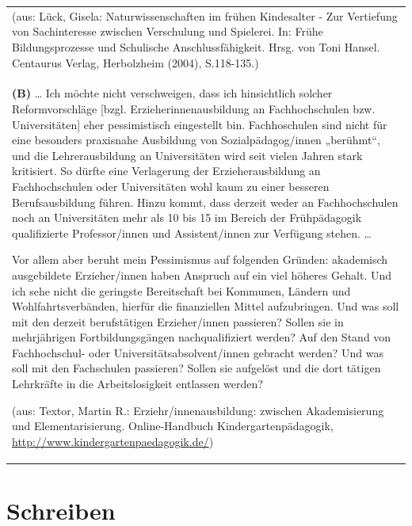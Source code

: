 \documentclass[]{book}
\theoremstyle{definition}
\theoremstyle{definition}
\theoremstyle{definition}
\theoremstyle{remark}
\begin{document}
\begin{longtable}[]{@{}l@{}}
\begin{minipage}[t]{0.97\columnwidth}
(aus: Lück, Gisela: Naturwissenschaften im frühen Kindesalter - Zur
Vertiefung von Sachinteresse zwischen Verschulung und Spielerei. In:
Frühe Bildungsprozesse und Schulische Anschlussfähigkeit. Hrsg. von Toni
Hansel. Centaurus Verlag, Herbolzheim (2004), S.118-135.)
\vspace{-6mm}\strut
\end{minipage}\tabularnewline
\begin{minipage}[t]{0.97\columnwidth}\raggedright\strut
\textbf{(B)} \ldots{} Ich möchte nicht verschweigen, dass ich
hinsichtlich solcher Reformvorschläge {[}bzgl. Erzieherinnenausbildung
an Fachhochschulen bzw. Universitäten{]} eher pessimistisch eingestellt
bin. Fachhoschulen sind nicht für eine besonders praxisnahe Ausbildung
von Sozialpädagog/innen „berühmt``, und die Lehrerausbildung an
Universitäten wird seit vielen Jahren stark kritisiert. So dürfte eine
Verlagerung der Erzieherausbildung an Fachhochschulen oder Universitäten
wohl kaum zu einer besseren Berufsausbildung führen. Hinzu kommt, dass
derzeit weder an Fachhochschulen noch an Universitäten mehr als 10 bis
15 im Bereich der Frühpädagogik qualifizierte Professor/innen und
Assistent/innen zur Verfügung stehen. \ldots{}

Vor allem aber beruht mein Pessimismus auf folgenden Gründen: akademisch
ausgebildete Erzieher/innen haben Anspruch auf ein viel höheres Gehalt.
Und ich sehe nicht die geringste Bereitschaft bei Kommunen, Ländern und
Wohlfahrtsverbänden, hierfür die finanziellen Mittel aufzubringen. Und
was soll mit den derzeit berufstätigen Erzieher/innen passieren? Sollen
sie in mehrjährigen Fortbildungsgängen nachqualifiziert werden? Auf den
Stand von Fachhochschul- oder Universitätsabsolvent/innen gebracht
werden? Und was soll mit den Fachschulen passieren? Sollen sie aufgelöst
und die dort tätigen Lehrkräfte in die Arbeitslosigkeit entlassen
werden?

(aus: Textor, Martin R.: Erziehr/innenausbildung: zwischen
Akademisierung und Elementarisierung. Online-Handbuch
Kindergartenpädagogik,
\url{http://www.kindergartenpaedagogik.de/})\strut
\end{minipage}\tabularnewline
\bottomrule
\end{longtable}

\hypertarget{schreiben}{\chapter{Schreiben}\label{schreiben}}
\end{document}
